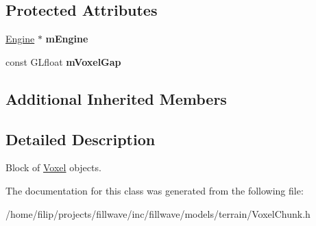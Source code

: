 \subsection*{Protected Attributes}
\begin{DoxyCompactItemize}
\item 
\mbox{\label{classflw_1_1flf_1_1VoxelChunk_a28db1ba31831e301f732ecd634490724}} 
\hyperlink{classflw_1_1Engine}{Engine} $\ast$ {\bfseries m\+Engine}
\item 
\mbox{\label{classflw_1_1flf_1_1VoxelChunk_a32a0b3d840f90ecd1486a8bb65a10466}} 
const G\+Lfloat {\bfseries m\+Voxel\+Gap}
\end{DoxyCompactItemize}
\subsection*{Additional Inherited Members}


\subsection{Detailed Description}
Block of \hyperlink{classflw_1_1flf_1_1Voxel}{Voxel} objects. 

The documentation for this class was generated from the following file\+:\begin{DoxyCompactItemize}
\item 
/home/filip/projects/fillwave/inc/fillwave/models/terrain/Voxel\+Chunk.\+h\end{DoxyCompactItemize}
